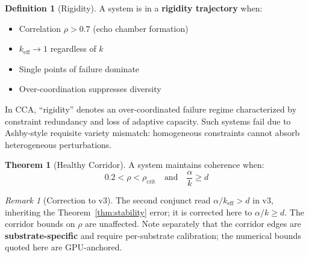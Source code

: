 \documentclass[11pt,a4paper]{article}
\theoremstyle{definition}
\newtheorem{definition}{Definition}[section]
\newtheorem{theorem}{Theorem}[section]
\theoremstyle{remark}
\newtheorem{remark}{Remark}[section]
\newcommand{\keff}{k_{\text{eff}}}
\newcommand{\rhocrit}{\rho_{\text{crit}}}
\begin{document}
\begin{definition}[Rigidity]
A system is in a \textbf{rigidity trajectory} when:
\begin{itemize}[noitemsep]
    \item Correlation $\rho > 0.7$ (echo chamber formation)
    \item $\keff \to 1$ regardless of $k$
    \item Single points of failure dominate
    \item Over-coordination suppresses diversity
\end{itemize}
In CCA, ``rigidity'' denotes an over-coordinated failure regime characterized by constraint redundancy and loss of adaptive capacity. Such systems fail due to Ashby-style requisite variety mismatch: homogeneous constraints cannot absorb heterogeneous perturbations.
\end{definition}

\begin{theorem}[Healthy Corridor]
A system maintains coherence when:
\begin{equation}
0.2 < \rho < \rhocrit \quad \text{and} \quad \frac{\alpha}{k} \geq d
\end{equation}
\end{theorem}

\begin{remark}[Correction to v3]
The second conjunct read $\alpha/\keff > d$ in v3, inheriting the Theorem~\ref{thm:stability} error; it is corrected here to $\alpha/k \geq d$. The corridor bounds on $\rho$ are unaffected. Note separately that the corridor edges are \textbf{substrate-specific} and require per-substrate calibration; the numerical bounds quoted here are GPU-anchored.
\end{remark}
\end{document}
